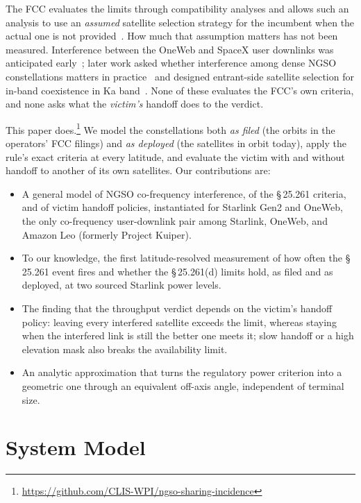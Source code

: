 \documentclass[conference]{IEEEtran}
\begin{document}
The FCC evaluates the limits through compatibility analyses and allows such an
analysis to use an \emph{assumed} satellite selection strategy for the incumbent
when the actual one is not provided~\cite{fcc24117}. How much that assumption
matters has not been measured. Interference between the OneWeb and SpaceX user
downlinks was anticipated early~\cite[Sec.~5.1]{delportillo2019}; later work
asked whether interference among dense NGSO constellations matters in
practice~\cite{braun2019} and designed entrant-side satellite selection for
in-band coexistence in Ka band~\cite{kim2025,kim2026selection}. None of these
evaluates the FCC's own criteria, and none asks what the \emph{victim's} handoff
does to the verdict.

This paper does.\footnote{\url{https://github.com/CLIS-WPI/ngso-sharing-incidence}}
We model the constellations both \emph{as filed} (the orbits in the operators'
FCC filings) and \emph{as deployed} (the satellites in orbit today), apply the
rule's exact criteria at every latitude, and evaluate the victim with and
without handoff to another of its own satellites. Our contributions are:
\begin{itemize}
\item A general model of NGSO co-frequency interference, of the \S\,25.261
criteria, and of victim handoff policies, instantiated for Starlink Gen2 and
OneWeb, the only co-frequency user-downlink pair among Starlink, OneWeb, and
Amazon Leo (formerly Project Kuiper).
\item To our knowledge, the first latitude-resolved measurement of how often the
\S\,25.261 event fires and whether the \S\,25.261(d) limits hold, as filed and as
deployed, at two sourced Starlink power levels.
\item The finding that the throughput verdict depends on the victim's handoff
policy: leaving every interfered satellite exceeds the limit, whereas staying
when the interfered link is still the better one meets it; slow handoff or a
high elevation mask also breaks the availability limit.
\item An analytic approximation that turns the regulatory power criterion into a
geometric one through an equivalent off-axis angle, independent of terminal size.
\end{itemize}

\section{System Model}
\label{sec:model}
\end{document}

